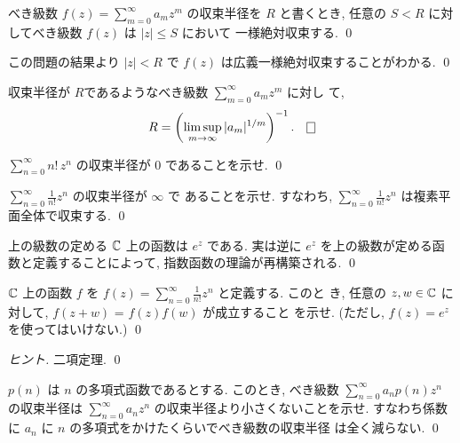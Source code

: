 \documentclass[12pt,twoside]{jarticle}
\begin{document}
\begin{question}
  べき級数 $f(z)=\sum_{m=0}^{\infty}a_mz^m$ の収束半径を $R$ と書くとき, 
  任意の $S<R$ に対してべき級数 $f(z)$ は $|z|\le S$ において
  一様絶対収束する. \qed
\end{question}

\begin{rem}
 この問題の結果より $|z|<R$ で $f(z)$ は広義一様絶対収束することがわかる.
 \qed
\end{rem}

\begin{question}
  収束半径が $R$であるようなべき級数 $\sum_{m=0}^{\infty}a_mz^m$ に対し
  て,
  \[
    R = \left( \limsup_{m\to\infty} |a_m|^{1/m} \right)^{-1}.
    \qed
  \]
\end{question}

\begin{question}
  $\sum\limits_{n=0}^\infty n!\,z^n$ の収束半径が $0$ であることを示せ.
  \qed
\end{question}

\begin{question}
  $\sum\limits_{n=0}^\infty \frac{1}{n!} z^n$ の収束半径が $\infty$ で
  あることを示せ. すなわち, $\sum\limits_{n=0}^\infty\frac{1}{n!}z^n$ 
  は複素平面全体で収束する. \qed
\end{question}

\begin{guide}
 上の級数の定める ${\mathbb C}$ 上の函数は $e^z$ である. 
 実は逆に $e^z$ を上の級数が定める函数と定義することによって, 
 指数函数の理論が再構築される.
\qed
\end{guide}

\begin{question}
  ${\mathbb C}$ 上の函数 $f$ を %
  $f(z)= \sum\limits_{n=0}^\infty \frac{1}{n!} z^n$ と定義する. このと
  き, 任意の $z,w\in{\mathbb C}$ に対して, $f(z+w)$ = $f(z)f(w)$ が成立すること
  を示せ. (ただし, $f(z)=e^z$ を使ってはいけない.) \qed
\end{question}

\begin{proof}[ヒント]
 二項定理. \qed
\end{proof}

\begin{question}
  $p(n)$ は $n$ の多項式函数であるとする. このとき, べき級数 %
  $\sum_{n=0}^{\infty} a_n p(n) z^n$ の収束半径は %
  $\sum_{n=0}^{\infty} a_n z^n$ の収束半径より小さくないことを示せ. %
  すなわち係数に $a_n$ に $n$ の多項式をかけたくらいでべき級数の収束半径
  は全く減らない. \qed
\end{question}
\end{document}
